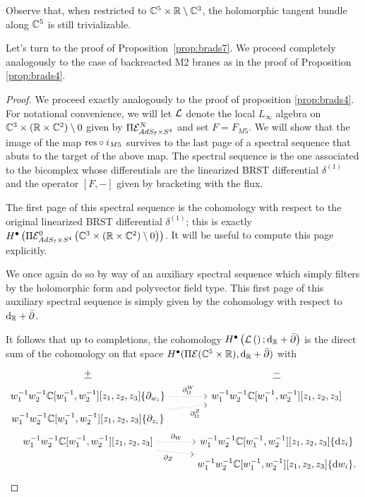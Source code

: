 Observe that, when restricted to $\mathbb{C}^5 \times \mathbb{R} \setminus \mathbb{C}^3$, the holomorphic tangent bundle along $\mathbb{C}^5$ is still trivializable. 

\parsec[]

Let's turn to the proof of Proposition~\ref{prop:brads7}.
We proceed completely analogously to the case of backreacted M2 branes as in the proof of Proposition \ref{prop:brads4}. 
\fi

\begin{proof}
We proceed exactly analogously to the proof of proposition \ref{prop:brads4}. For notational convenience, we will let $\mathcal{L}$ denote the local $L_\infty$ algebra on  $\mathbb{C}^3\times (\mathbb{R}\times \mathbb{C}^2)\setminus 0$ given by $\Pi\mathcal{E}^N_{AdS_7\times S^4}$ and set $F = F_{M5}$. We will show that the image of the map $\mathrm{res}\circ i_{M5}$ survives to the last page of a spectral sequence that abuts to the target of the above map. The spectral sequence is the one associated to the bicomplex whose differentials are the linearized BRST differential $\delta^{(1)}$ and the operator $[F,- ]$ given by bracketing with the flux.

The first page of this spectral sequence is the cohomology with respect to the original linearized BRST differential $\delta^{(1)}$; this is exactly $H^\bullet \left ( \Pi \mathcal{E}^0 _{AdS_7\times S^4} \left ( \mathbb{C}^3\times (\mathbb{R}\times \mathbb{C}^2)\setminus 0\right )\right )$. It will be useful to compute this page explicitly.

We once again do so by way of an auxiliary spectral sequence which simply filters by the holomorphic form and polyvector field type. 
This first page of this auxiliary spectral sequence is simply given by the cohomology with respect to $\mathrm{d}_{\mathbb{R}}+\bar{\partial}$. 

It follows that up to completions, the cohomology $H^\bullet \left ( \mathcal{L}\left ( \right ) ; \mathrm{d}_{\mathbb{R}} +\bar{\partial}\right )$  is the direct sum of the cohomology on flat space $H^\bullet(\Pi \mathcal{E}(\mathbb{C}^5 \times \mathbb{R}), \mathrm{d}_{\mathbb{R}}+\bar{\partial})$ with
\begin{equation}
  \label{eqn:ads7ss2} 
  \begin{tikzcd}[row sep = 1 ex]
    \ul{+} & \ul{-} \\ 
w_1^{-1} w_2^{-1} \C[w_1^{-1}, w_2^{-1}][z_1,z_2,z_3] \{\partial_{w_i}\}  \ar[r, dotted, "\div^W"] & w_1^{-1} w_2^{-1} \C[w_1^{-1}, w_2^{-1}] [z_1,z_2,z_3] \\
w_1^{-1} w_2^{-1} \C[w_1^{-1}, w_2^{-1}] [z_1,z_2,z_3] \{\del_{z_i}\} \ar[ur, dotted, "\div^Z"'] \\
w_1^{-1} w_2^{-1} \C[w_1^{-1}, w_2^{-1}] [z_1,z_2,z_3] \ar[r, dotted, "\del_W"] \ar[dr, dotted, "\del_Z"'] & w_1^{-1} w_2^{-1} \C[w_1^{-1}, w_2^{-1}][z_1,z_2,z_3] \{\d z_i\} \\ & w_1^{-1} w_2^{-1} \C[w_1^{-1}, w_2^{-1}][z_1,z_2,z_3] \{\d w_i\} .
\end{tikzcd}
\end{equation}


\end{proof}
